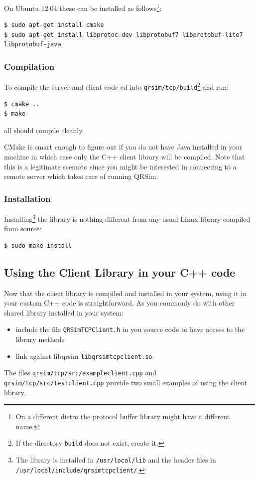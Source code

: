 \documentclass[a4paper,11pt]{report}
\begin{document}
On Ubuntu 12.04 these can be installed as follows\footnote{On a different distro the protocol buffer library might have a different name.}:
\begin{verbatim}
$ sudo apt-get install cmake
$ sudo apt-get install libprotoc-dev libprotobuf7 libprotobuf-lite7 libprotobuf-java
\end{verbatim}

\subsubsection{Compilation} \label{comp}
To compile the server and client code cd into \texttt{qrsim/tcp/build}\footnote{If the directory \texttt{build} does not exist, create it.} and run:
 \begin{verbatim}
$ cmake ..
$ make
\end{verbatim}
all should compile cleanly.

CMake is smart enough to figure out if you do not have Java installed in your machine in which case only the C++ client library will be compiled.
Note that this is a legitimate scenario since you might be interested in connecting to a remote server which takes care of running QRSim. 

\subsubsection{Installation}\label{inst}
Installing\footnote{The library is installed in \texttt{/usr/local/lib} and the header files in \texttt{/usr/local/include/qrsimtcpclient/}.} the library is nothing different from any usual Linux library compiled from source:

\begin{verbatim}
$ sudo make install
\end{verbatim}

\subsection{Using the Client Library in your C++ code}

Now that the client library is compiled and installed in your system, using it in your custom C++ code is straightforward.
As you commonly do with other shared library installed in your system:
\begin{itemize}
\item include the file \texttt{QRSimTCPClient.h} in you source code to have access to the library methods
\item link against libqrsim \texttt{libqrsimtcpclient.so}.
\end{itemize}
The files \texttt{qrsim/tcp/src/exampleclient.cpp} and \texttt{qrsim/tcp/src/testclient.cpp} provide two small examples of using the client library.
\end{document}
